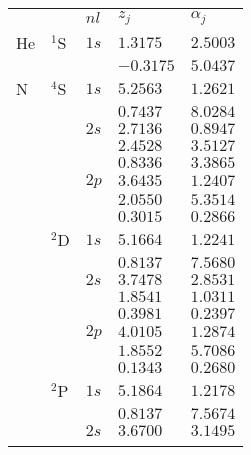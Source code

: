 {{{{%
\begin{table}
\begin{center}
\begin{tabularx}{\textwidth}{
>{\centering\arraybackslash}p{}
>{\centering\arraybackslash}p{}
>{\centering\arraybackslash}p{}
>{\centering\arraybackslash}p{}
>{\centering\arraybackslash}p{}}
\rowcolor{mydarkgray} 
   &       & $nl$ & $z_j$        & $\alpha_j$   \\
He & $^1$S & $1s$ &  $1.3175$ & $2.5003$  \\\rowcolor{mygray} 
   &       &      & $-0.3175$ & $5.0437$  \\ 
N  & $^4$S & $1s$ & $5.2563$ & $1.2621$  \\\rowcolor{mygray} 
   &       &      & $0.7437$ & $8.0284$  \\ 
   &       & $2s$ & $2.7136$ & $0.8947$ \\\rowcolor{mygray} 
   &       &      & $2.4528$ & $3.5127$  \\
   &       &      & $0.8336$ & $3.3865$  \\ \rowcolor{mygray} 
   &       & $2p$ & $3.6435$ & $1.2407$  \\ 
   &       &      & $2.0550$ & $5.3514$  \\\rowcolor{mygray} 
   &       &      & $0.3015$ & $0.2866$ \\
   & $^2$D & $1s$ & $5.1664$ & $1.2241$  \\\rowcolor{mygray} 
   &       &      & $0.8137$ & $7.5680$  \\ 
   &       & $2s$ & $3.7478$ & $2.8531$  \\\rowcolor{mygray} 
   &       &      & $1.8541$ & $1.0311$  \\ 
   &       &      & $0.3981$ & $0.2397$ \\\rowcolor{mygray} 
   &       & $2p$ & $4.0105$ & $1.2874$  \\ 
   &       &      & $1.8552$ & $5.7086$  \\\rowcolor{mygray} 
   &       &      & $0.1343$ & $0.2680$ \\
   & $^2$P & $1s$ & $5.1864$ & $1.2178$  \\\rowcolor{mygray} 
   &       &      & $0.8137$ & $7.5674$  \\ 
   &       & $2s$ & $3.6700$ & $3.1495$  \\\rowcolor{mygray} 

\end{tabularx}
\end{center}
\end{table}}}}}
